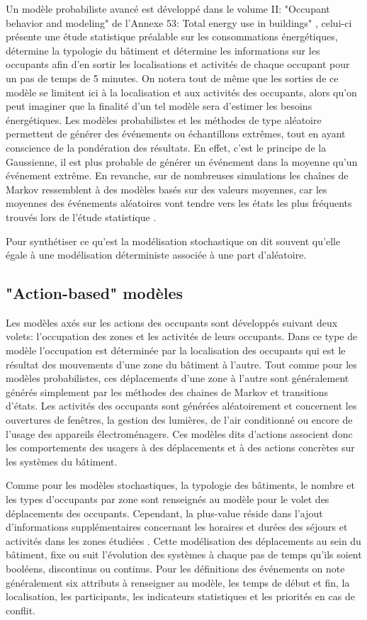 Un modèle probabiliste avancé est développé dans le volume II: "Occupant behavior and modeling" de l'Annexe 53: Total energy use in buildings" \cite{Annex-53-1}, celui-ci présente une étude statistique préalable sur les consommations énergétiques, détermine la typologie du bâtiment et détermine les informations sur les occupants afin d'en sortir les localisations et activités de chaque occupant pour un pas de temps de 5 minutes. On notera tout de même que les sorties de ce modèle se limitent ici à la localisation et aux activités des occupants, alors qu'on peut imaginer que la finalité d'un tel modèle sera d'estimer les besoins énergétiques. Les modèles probabilistes et les méthodes de type aléatoire permettent de générer des événements ou échantillons extrêmes, tout en ayant conscience de la pondération des  résultats. En effet, c'est le principe de la Gaussienne, il est plus probable de générer un événement dans la moyenne qu'un événement extrême. En revanche, sur de nombreuses simulations les chaînes de Markov ressemblent à des modèles basés sur des valeurs moyennes, car les moyennes des événements aléatoires vont tendre vers les états les plus fréquents trouvés lors de l'étude statistique \cite{Annex-53-1}.

Pour synthétiser ce qu'est la modélisation stochastique on dit souvent qu'elle égale à une modélisation déterministe associée à une part d'aléatoire.

\subsection{"Action-based" modèles}

Les modèles axés sur les actions des occupants sont développés suivant deux volets: l'occupation des zones et les activités de leurs occupants. Dans ce type de modèle l'occupation est déterminée par la localisation des occupants qui est le résultat des mouvements d'une zone du bâtiment à l'autre. Tout comme pour les modèles probabilistes, ces déplacements d'une zone à l'autre sont généralement générés simplement par les méthodes des chaines de Markov et transitions d'états. Les activités des occupants sont générées aléatoirement et concernent les ouvertures de fenêtres, la gestion des lumières, de l'air conditionné ou encore de l'usage des appareils électroménagers. Ces modèles dits d'actions associent donc les comportements des usagers à des déplacements et à des actions concrètes sur les systèmes du bâtiment.

Comme pour les modèles stochastiques, la typologie des bâtiments, le nombre et les types d'occupants par zone sont renseignés au modèle pour le volet des déplacements des occupants. Cependant, la plus-value réside dans l'ajout d'informations supplémentaires concernant les horaires et durées des séjours et activités dans les zones étudiées \cite{Annex-53-1}. Cette modélisation des déplacements au sein du bâtiment, fixe ou suit l'évolution des systèmes à chaque pas de temps qu'ils soient booléens, discontinus ou continus. Pour les définitions des événements on note généralement six attributs à renseigner au modèle, les temps de début et fin, la localisation, les participants, les indicateurs statistiques et les priorités en cas de conflit. 

